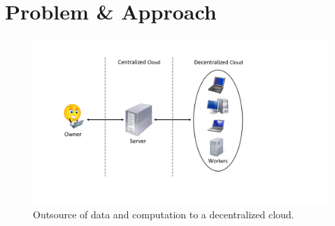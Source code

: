\section{Problem \& Approach} \label{sect:problem}

\begin{figure}[t]\centering
  \includegraphics[scale=0.35]{model.pdf}
  \caption{Outsource of data and computation to a decentralized cloud.}
  \label{fig:model}
\end{figure}